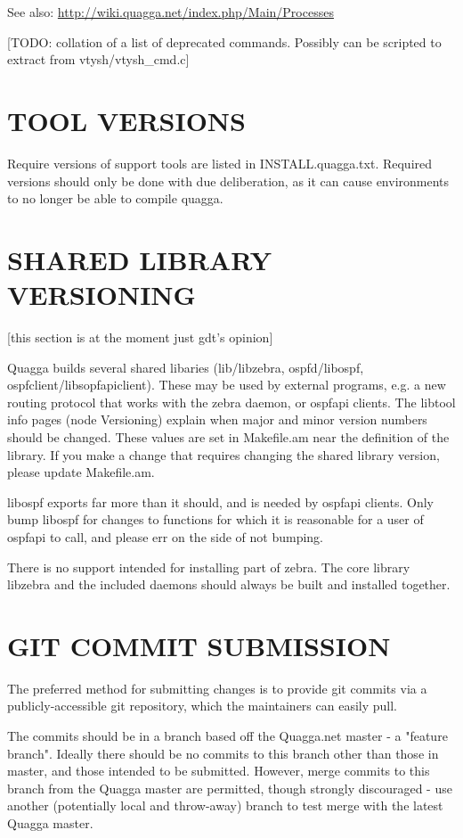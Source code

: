 \documentclass[oneside]{article}
\begin{document}
See also: \url{http://wiki.quagga.net/index.php/Main/Processes}

[TODO: collation of a list of deprecated commands. Possibly can be scripted
to extract from vtysh/vtysh\_cmd.c]


\section{TOOL VERSIONS}

Require versions of support tools are listed in INSTALL.quagga.txt.
Required versions should only be done with due deliberation, as it can
cause environments to no longer be able to compile quagga.


\section{SHARED LIBRARY VERSIONING}
\label{sec:dll-versioning}

[this section is at the moment just gdt's opinion]

Quagga builds several shared libaries (lib/libzebra, ospfd/libospf, 
ospfclient/libsopfapiclient).  These may be used by external programs,
e.g. a new routing protocol that works with the zebra daemon, or
ospfapi clients.  The libtool info pages (node Versioning) explain
when major and minor version numbers should be changed.  These values
are set in Makefile.am near the definition of the library.  If you
make a change that requires changing the shared library version,
please update Makefile.am.

libospf exports far more than it should, and is needed by ospfapi
clients.  Only bump libospf for changes to functions for which it is
reasonable for a user of ospfapi to call, and please err on the side
of not bumping.

There is no support intended for installing part of zebra.  The core
library libzebra and the included daemons should always be built and
installed together.


\section{GIT COMMIT SUBMISSION}
\label{sec:git-submission}

The preferred method for submitting changes is to provide git commits via a
publicly-accessible git repository, which the maintainers can easily pull.

The commits should be in a branch based off the Quagga.net master - a
"feature branch".  Ideally there should be no commits to this branch other
than those in master, and those intended to be submitted.  However, merge
commits to this branch from the Quagga master are permitted, though strongly
discouraged - use another (potentially local and throw-away) branch to test
merge with the latest Quagga master.
\end{document}
